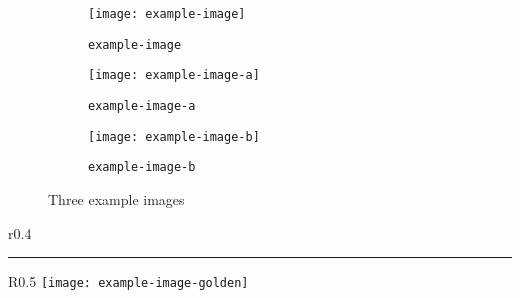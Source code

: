 \documentclass[12pt]{article}
\begin{document}
\begin{figure}[hbt!]
     \centering
     \begin{subfigure}[t]{0.3\textwidth}
         \centering
         \texttt{[image: example-image]}
         \cprotect\caption{\verb|example-image|}
         \label{fig:example}
     \end{subfigure}
     \hfill
     \begin{subfigure}[t]{0.3\textwidth}
         \centering
         \texttt{[image: example-image-a]}
         \cprotect\caption{\verb|example-image-a|}
         \label{fig:a}
     \end{subfigure}
     \hfill
     \begin{subfigure}[t]{0.3\textwidth}
         \centering
         \texttt{[image: example-image-b]}
         \cprotect\caption{\verb|example-image-b|}
         \label{fig:b}
     \end{subfigure}
        \caption{Three example images}
        \label{fig:three graphs}
\end{figure}

\lipsum[3]

\begin{wrapfigure}{r}{0.4\textwidth}                 %
        \centering
        \rule{4cm}{6cm}
        \cprotect\caption{Wraped figure using \verb|\begin{wrapfigure}|}           %
\end{wrapfigure}

\blindtext

\begin{wrapfigure}{R}{0.5\textwidth}                 
        \centering
        \texttt{[image: example-image-golden]}
        \caption{Image of Golden Ratio}
\end{wrapfigure}

\lipsum[1-4]



\end{document}
